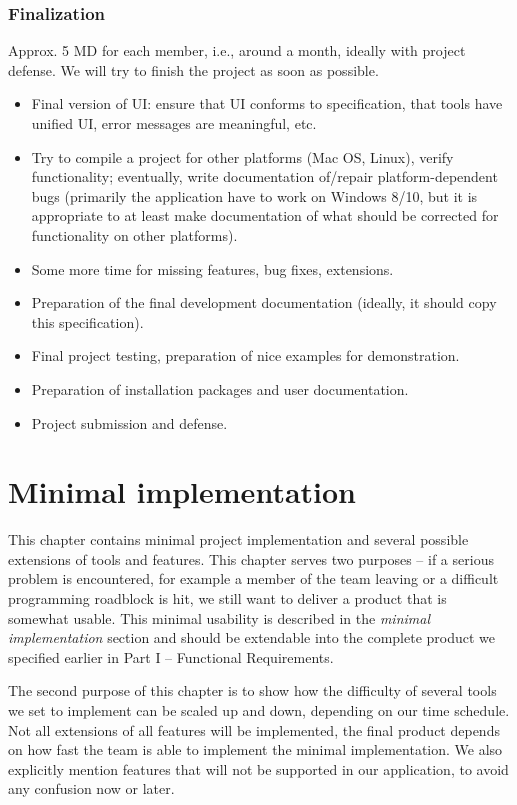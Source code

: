 \subsection{Finalization}

Approx. 5 MD for each member, i.e., around a month, ideally with project defense. We will try to finish the project as soon as possible.

\begin{itemize}
\item Final version of UI: ensure that UI conforms to specification, that tools have unified UI, error messages are meaningful, etc. 
\item Try to compile a project for other platforms (Mac OS, Linux), verify functionality; eventually, write documentation of/repair platform-dependent bugs (primarily the application have to work on Windows 8/10, but it is appropriate to at least make documentation of what should be corrected for functionality on other platforms).
\item Some more time for missing features, bug fixes, extensions.
\item Preparation of the final development documentation (ideally, it should copy this specification).
\item Final project testing, preparation of nice examples for demonstration.
\item Preparation of installation packages and user documentation.
\item Project submission and defense.
\end{itemize}


\chapter{Minimal implementation}

This chapter contains minimal project implementation and several possible extensions of tools and features. This chapter serves two purposes -- if a serious problem is encountered, for example a member of the team leaving or a difficult programming roadblock is hit, we still want to deliver a product that is somewhat usable. This minimal usability is described in the \textit{minimal implementation} section and should be extendable into the complete product we specified earlier in Part I -- Functional Requirements.

The second purpose of this chapter is to show how the difficulty of several tools we set to implement can be scaled up and down, depending on our time schedule. Not all extensions of all features will be implemented, the final product depends on how fast the team is able to implement the minimal implementation. We also explicitly mention features that will not be supported in our application, to avoid any confusion now or later.

